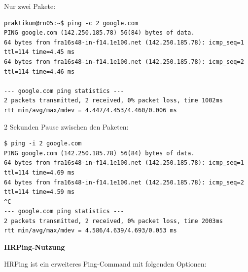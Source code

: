 Nur zwei Pakete:

\begin{verbatim}
praktikum@rn05:~$ ping -c 2 google.com
PING google.com (142.250.185.78) 56(84) bytes of data.
64 bytes from fra16s48-in-f14.1e100.net (142.250.185.78): icmp_seq=1 ttl=114 time=4.45 ms
64 bytes from fra16s48-in-f14.1e100.net (142.250.185.78): icmp_seq=2 ttl=114 time=4.46 ms

--- google.com ping statistics ---
2 packets transmitted, 2 received, 0% packet loss, time 1002ms
rtt min/avg/max/mdev = 4.447/4.453/4.460/0.006 ms
\end{verbatim}

2 Sekunden Pause zwischen den Paketen:

\begin{verbatim}
$ ping -i 2 google.com
PING google.com (142.250.185.78) 56(84) bytes of data.
64 bytes from fra16s48-in-f14.1e100.net (142.250.185.78): icmp_seq=1 ttl=114 time=4.69 ms
64 bytes from fra16s48-in-f14.1e100.net (142.250.185.78): icmp_seq=2 ttl=114 time=4.59 ms
^C
--- google.com ping statistics ---
2 packets transmitted, 2 received, 0% packet loss, time 2003ms
rtt min/avg/max/mdev = 4.586/4.639/4.693/0.053 ms
\end{verbatim}

\textbf{HRPing-Nutzung}

HRPing ist ein erweiteres Ping-Command mit folgenden Optionen:

